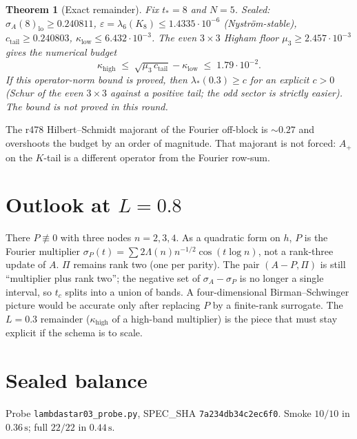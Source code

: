 \documentclass[11pt]{article}
\newtheorem{theorem}{Theorem}
\theoremstyle{remark}
\begin{document}
\begin{theorem}[Exact remainder]\label{thm:red}
Fix $t_*=8$ and $N=5$.  Sealed:
$\sigma_A(8)_{\mathrm{lo}}\ge0.240811$,
$\varepsilon=\lambda_6(K_8)\le1.4335\cdot10^{-6}$ (Nystr\"om-stable),
$c_{\mathrm{tail}}\ge0.240803$,
$\kappa_{\mathrm{low}}\le6.432\cdot10^{-3}$.
The even $3\times3$ Higham floor $\mu_3\ge2.457\cdot10^{-3}$
gives the numerical budget
\[
 \kappa_{\mathrm{high}}
 \;\le\;
 \sqrt{\mu_3\,c_{\mathrm{tail}}}-\kappa_{\mathrm{low}}
 \;\le\;1.79\cdot10^{-2}.
\]
If this operator-norm bound is proved, then
$\lambda_*(0.3)\ge c$ for an explicit $c>0$
(Schur of the even $3\times3$ against a positive tail;
the odd sector is strictly easier).
The bound is not proved in this round.
\end{theorem}

The r478 Hilbert--Schmidt majorant of the Fourier off-block
is $\sim0.27$ and overshoots the budget by an order of
magnitude.  That majorant is not forced: $A_+$ on the
$K$-tail is a different operator from the Fourier row-sum.

\section{Outlook at $L=0.8$}

There $P\not\equiv0$ with three nodes $n=2,3,4$.
As a quadratic form on $h$, $P$ is the Fourier multiplier
$\sigma_P(t)=\sum 2\Lambda(n)n^{-1/2}\cos(t\log n)$,
not a rank-three update of $A$.
$\Pi$ remains rank two (one per parity).
The pair $(A-P,\Pi)$ is still ``multiplier plus rank two'';
the negative set of $\sigma_A-\sigma_P$ is no longer a
single interval, so $t_c$ splits into a union of bands.
A four-dimensional Birman--Schwinger picture would be
accurate only after replacing $P$ by a finite-rank
surrogate.  The $L=0.3$ remainder
($\kappa_{\mathrm{high}}$ of a high-band multiplier)
is the piece that must stay explicit if the schema is to
scale.

\section{Sealed balance}

Probe \texttt{lambdastar03\_probe.py},
SPEC\_SHA \texttt{7a234db34c2ec6f0}.
Smoke $10/10$ in $0.36\,\mathrm{s}$; full $22/22$ in $0.44\,\mathrm{s}$.
\end{document}
